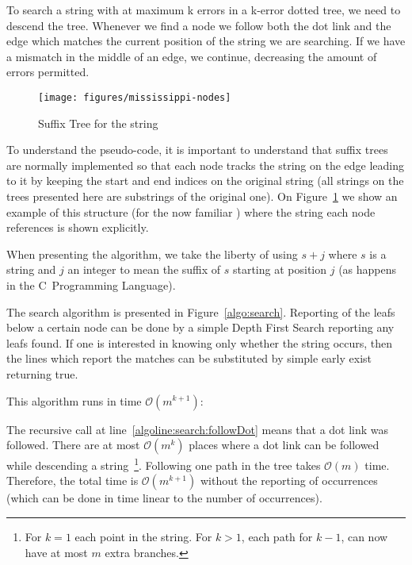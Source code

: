 To search a string with at maximum k errors in a k-error dotted tree, we need to descend the tree. Whenever we find a node we follow both the dot link and the edge which matches the current position of the string we are searching. If we have a mismatch in the middle of an edge, we continue, decreasing the amount of errors permitted.

\begin{figure}
\texttt{[image: figures/mississippi-nodes]}
\caption{Suffix Tree for the string }%
\label{fig:mississippi-nodes}
\end{figure}

To understand the pseudo-code, it is important to understand that suffix trees are normally implemented so that each node tracks the string on the edge leading to it by keeping the start and end indices on the original string (all strings on the trees presented here are substrings of the original one). On Figure~\ref{fig:mississippi-nodes} we show an example of this structure (for the now familiar ) where the string each node references is shown explicitly.

When presenting the algorithm, we take the liberty of using $s+j$ where $s$ is a string and $j$ an integer to mean the suffix of $s$ starting at position $j$ (as happens in the C~Programming Language).



The search algorithm is presented in Figure~\ref{algo:search}. Reporting of the leafs below a certain node can be done by a simple Depth First Search reporting any leafs found. If one is interested in knowing only whether the string occurs, then the lines which report the matches can be substituted by simple early exist returning true.

This algorithm runs in time $\mathcal{O}(m^{k+1})$:

The recursive call at line~\ref{algoline:search:followDot} means that a dot link was followed. There are at most $\mathcal{O}(m^k)$ places where a dot link can be followed while descending a string~\footnote{For $k=1$ each point in the string. For $k>1$, each path for $k-1$, can now have at most $m$ extra branches.}. Following one path in the tree takes $\mathcal{O}(m)$ time. Therefore, the total time is $\mathcal{O}(m^{k+1})$ without the reporting of occurrences (which can be done in time linear to the number of occurrences).
